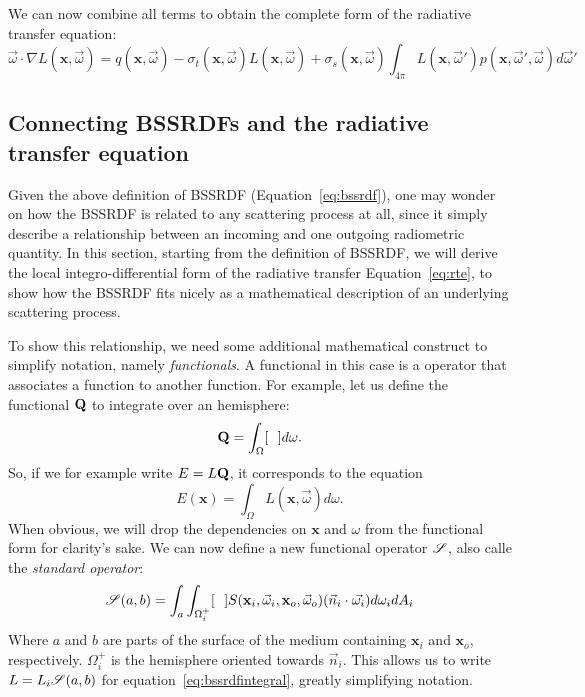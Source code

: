 We can now combine all terms to obtain the complete form of the radiative transfer equation:
\begin{equation}
\label{eq:rte}
\vec{\omega} \cdot \nabla L(\mathbf{x}, \vec{\omega}) = q(\mathbf{x}, \vec{\omega}) - \sigma_t(\mathbf{x}, \vec{\omega}) L(\mathbf{x}, \vec{\omega}) + \sigma_s(\mathbf{x}, \vec{\omega}) \int_{4\pi} L(\mathbf{x}, \vec{\omega}')  p(\mathbf{x}, \vec{\omega}', \vec{\omega}) d \vec{\omega}'
\end{equation}
\subsection{Connecting BSSRDFs and the radiative transfer equation}

Given the above definition of BSSRDF (Equation~\ref{eq:bssrdf}), one may wonder on how the BSSRDF is related to any scattering process at all, since it simply describe a relationship between an incoming and one outgoing radiometric quantity. In this section, starting from the definition of BSSRDF, we will derive the local integro-differential form of the radiative transfer Equation~\ref{eq:rte}, to show how the BSSRDF fits nicely as a mathematical description of an underlying scattering process. 

To show this relationship, we need some additional mathematical construct to simplify notation, namely \emph{functionals}. A functional in this case is a operator that associates a function to another function. For example, let us define the functional $\mathbf{Q}$ to integrate over an hemisphere:
\begin{equation*}
\operator{Q} = \int_\Omega [\ \ ] d\omega.
\end{equation*}
So, if we for example write $E = L\mathbf{Q}$, it corresponds to the equation
\begin{equation*}
E(\mathbf{x}) = \int_\Omega L(\mathbf{x}, \vec{\omega}) d\omega.
\end{equation*}
When obvious, we will drop the dependencies on $\mathbf{x}$ and $\omega$ from the functional form for clarity's sake. We can now define a new functional operator $\mathscr{S}$, also calle the \emph{standard operator}:
\begin{equation*}
\mathscr{S}(a,b) = \int_a \int_{\Omega_i^+} [\ \ ] S(\mathbf{x}_i, \vec{\omega}_i, \mathbf{x}_o, \vec{\omega}_o) (\vec{n}_i \cdot \vec{\omega_i}) d \omega_i d A_i
\end{equation*}
Where $a$ and $b$ are parts of the surface of the medium containing $\mathbf{x}_i$ and $\mathbf{x}_o$, respectively. $\Omega_i^+$ is the hemisphere oriented towards $\vec{n}_i$. This allows us to write $L = L_i \mathscr{S}(a,b)$ for equation~\ref{eq:bssrdfintegral}, greatly simplifying notation.

